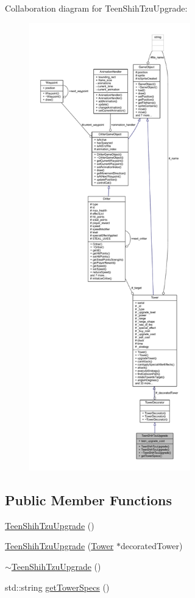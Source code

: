 Collaboration diagram for Teen\+Shih\+Tzu\+Upgrade\+:
\nopagebreak
\begin{figure}[H]
\begin{center}
\leavevmode
\includegraphics[height=550pt]{class_teen_shih_tzu_upgrade__coll__graph}
\end{center}
\end{figure}
\subsection*{Public Member Functions}
\begin{DoxyCompactItemize}
\item 
\hyperlink{class_teen_shih_tzu_upgrade_aa26860c4f87ceefe1f3ec32df9bd6cbb}{Teen\+Shih\+Tzu\+Upgrade} ()
\item 
\hyperlink{class_teen_shih_tzu_upgrade_ac9c5b3bfe2a3b2529b649871e3afa4c3}{Teen\+Shih\+Tzu\+Upgrade} (\hyperlink{class_tower}{Tower} $\ast$decorated\+Tower)
\item 
\hyperlink{class_teen_shih_tzu_upgrade_a242f17b2c40975860612f7157f813e0d}{$\sim$\+Teen\+Shih\+Tzu\+Upgrade} ()
\item 
std\+::string \hyperlink{class_teen_shih_tzu_upgrade_a2db9fffe978423d001bd7e37c7d7fbc4}{get\+Tower\+Specs} ()
\end{DoxyCompactItemize}
